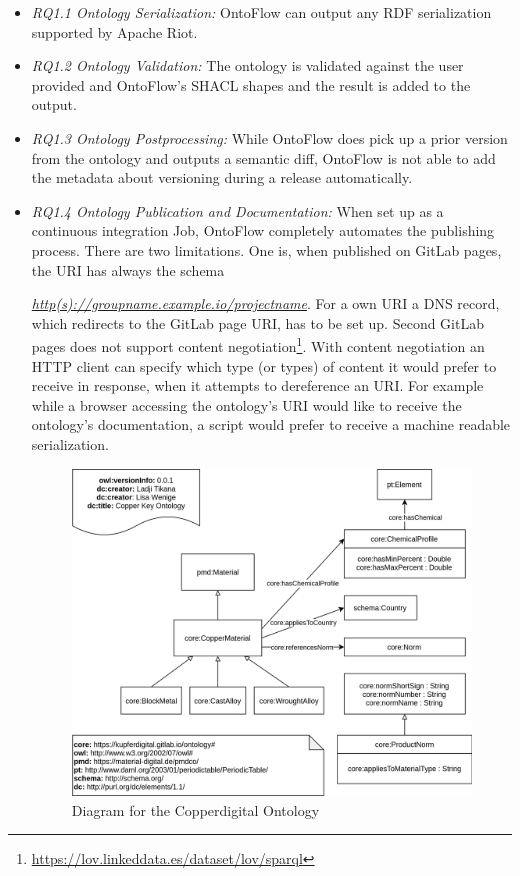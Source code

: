\documentclass[sigconf]{acmart}
\begin{document}
\begin{itemize}[leftmargin=*]
\item \textit{RQ1.1 Ontology Serialization:} OntoFlow can output any RDF serialization supported by Apache Riot.
\item \textit{RQ1.2 Ontology Validation:} The ontology is validated against the user provided and OntoFlow's SHACL shapes and the result is added to the output.
\item \textit{RQ1.3 Ontology Postprocessing:} While OntoFlow does pick up a prior version from the ontology and outputs a semantic diff, OntoFlow is not able to add the metadata about versioning during a release automatically.
\item \textit{RQ1.4 Ontology Publication and Documentation:} When set up as a continuous integration Job, OntoFlow completely automates the publishing process. There are two limitations. One is, when published on GitLab pages, the URI has always the schema  

  \mbox{\textit{\url{http(s)://groupname.example.io/projectname}}}. For a own URI a DNS record, which redirects to the GitLab page URI, has to be set up. Second GitLab pages does not support content negotiation\footnote{\url{https://lov.linkeddata.es/dataset/lov/sparql}}. With content negotiation an HTTP client can specify which type (or types) of content it would prefer to receive in response, when it attempts to dereference an URI. For example while a browser accessing the ontology's URI would like to receive the ontology's documentation, a script would prefer to receive a machine readable serialization. 

\begin{figure}[h]
  \centering
  \includegraphics[width=\columnwidth]{copperkey.png}
  \caption{Diagram for the Copperdigital Ontology}
  \label{fig:copperkey}
\end{figure}


\end{itemize}
\end{document}
